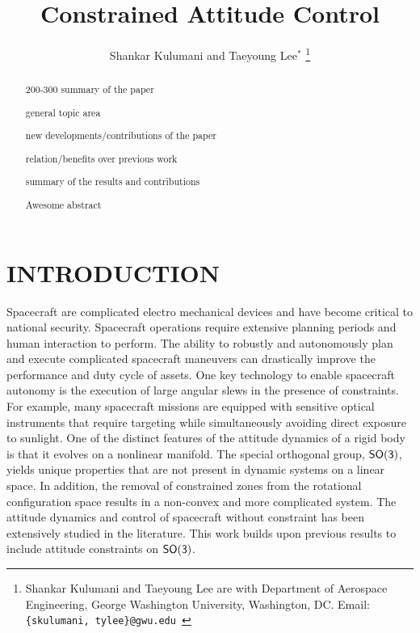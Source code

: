 \documentclass[letterpaper, 10 pt, conference]{ieeeconf}  %
\title{\LARGE \bf
Constrained Attitude Control
}
\author{Shankar Kulumani and Taeyoung Lee$^*$
 \thanks{Shankar Kulumani and Taeyoung Lee are with Department of Aerospace Engineering, George Washington University, Washington, DC. Email: {\tt\footnotesize \{skulumani, tylee\}@gwu.edu }}
 }
\begin{document}
\maketitle
\thispagestyle{empty}
\pagestyle{empty}


\begin{abstract}

200-300 summary of the paper

general topic area

new developments/contributions of the paper

relation/benefits over previous work

summary of the results and contributions

Awesome abstract

\end{abstract}


\section{INTRODUCTION}

Spacecraft are complicated electro mechanical devices and have become critical to national security.
Spacecraft operations require extensive planning periods and human interaction to perform.
The ability to robustly and autonomously plan and execute complicated spacecraft maneuvers can drastically improve the performance and duty cycle of assets.
One key technology to enable spacecraft autonomy is the execution of large angular slews in the presence of constraints.
For example, many spacecraft missions are equipped with sensitive optical instruments that require targeting while simultaneously avoiding direct exposure to sunlight.
One of the distinct features of the attitude dynamics of a rigid body is that it evolves on a nonlinear manifold.
The special orthogonal group, \( \mathsf{SO(3)} \), yields unique properties that are not present in dynamic systems on a linear space. 
In addition, the removal of constrained zones from the rotational configuration space results in a non-convex and more complicated system.
The attitude dynamics and control of spacecraft without constraint has been extensively studied in the literature.
This work builds upon previous results to include attitude constraints on \( \mathsf{SO(3)} \).
\end{document}
